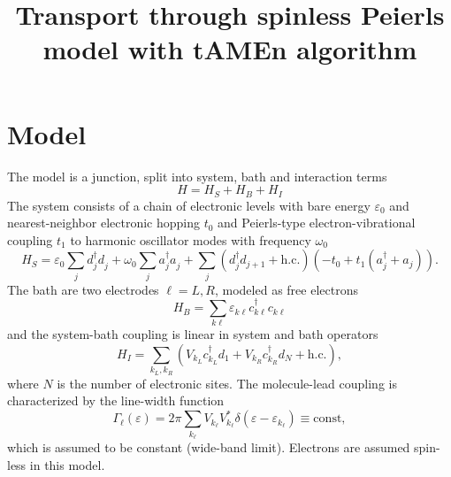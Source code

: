 \documentclass{article}
\newcommand{\pdagger}{{\phantom{\dagger}}}
\begin{document}
\title{Transport through spinless Peierls model with tAMEn algorithm}
\maketitle

\section{Model}
The model is a junction, split into system, bath and interaction terms
\begin{equation}
	H = H_S + H_B + H_I
\end{equation}  
The system consists of a chain of electronic levels with bare energy $\varepsilon_0$ and nearest-neighbor electronic hopping $t_0$ and Peierls-type electron-vibrational coupling $t_1$ to harmonic oscillator modes with frequency $\omega_0$
\begin{equation}
	H_S = \varepsilon_0 \sum_j  d^\dagger_j d_j^\pdagger + \omega_0 \sum_j a_j^\dagger a_j^\pdagger + \sum_{j} (d_j^\dagger d_{j+1} + \mathrm{h.c.})( -t_0 + t_1(a_j^\dagger + a_j)).
\end{equation}
The bath are two electrodes $\ell=L,R$, modeled as free electrons
\begin{equation}
	H_B = \sum_{k\ell} \varepsilon_{k\ell}c^\dagger_{k\ell}c^\pdagger_{k\ell}
\end{equation}
and the system-bath coupling is linear in system and bath operators
\begin{equation}
	H_I = \sum_{k_L, k_R} (V_{k_L} c_{k_L}^\dagger d_1 + V_{k_R} c_{k_R}^\dagger d_N  + \mathrm{h.c.}),
\end{equation}
where $N$ is the number of electronic sites. The molecule-lead coupling is characterized by the line-width function
\begin{equation}
	\Gamma_\ell(\varepsilon) = 2\pi\sum_{k_\ell} V_{k_\ell}V_{k_\ell}^* \delta(\varepsilon-\varepsilon_{k_\ell}) \equiv \mathrm{const},
\end{equation}
which is assumed to be constant (wide-band limit). Electrons are assumed spin-less in this model.
\end{document}
